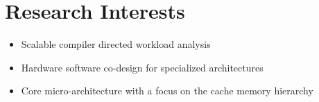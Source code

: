 
\section{Research Interests}
\begin{itemize}[noitemsep,nolistsep]
\item Scalable compiler directed workload analysis 
\item Hardware software co-design for specialized architectures 
\item Core micro-architecture with a focus on the cache memory hierarchy
\end{itemize}

